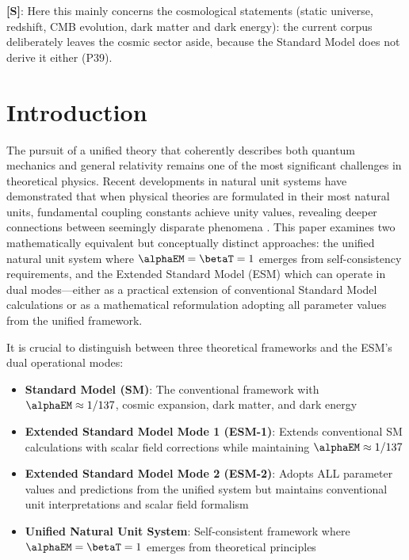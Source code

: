 	\noindent \textbf{[S]}: Here this mainly concerns the cosmological statements (static universe, redshift, CMB evolution, dark matter and dark energy): the current corpus deliberately leaves the cosmic sector aside, because the Standard Model does not derive it either (P39).
	
	\section{Introduction}
	\label{sec:introduction}
	
	The pursuit of a unified theory that coherently describes both quantum mechanics and general relativity remains one of the most significant challenges in theoretical physics. Recent developments in natural unit systems have demonstrated that when physical theories are formulated in their most natural units, fundamental coupling constants achieve unity values, revealing deeper connections between seemingly disparate phenomena \cite{pascher_unified_2025}. This paper examines two mathematically equivalent but conceptually distinct approaches: the unified natural unit system where $\alphaEM = \betaT = 1$ emerges from self-consistency requirements, and the Extended Standard Model (ESM) which can operate in dual modes—either as a practical extension of conventional Standard Model calculations or as a mathematical reformulation adopting all parameter values from the unified framework.
	
	It is crucial to distinguish between three theoretical frameworks and the ESM's dual operational modes:
	
	\begin{itemize}
		\item \textbf{Standard Model (SM)}: The conventional framework with $\alphaEM \approx 1/137$, cosmic expansion, dark matter, and dark energy \cite{Weinberg1989,PDG2020}
		\item \textbf{Extended Standard Model Mode 1 (ESM-1)}: Extends conventional SM calculations with scalar field corrections while maintaining $\alphaEM \approx 1/137$
		\item \textbf{Extended Standard Model Mode 2 (ESM-2)}: Adopts ALL parameter values and predictions from the unified system but maintains conventional unit interpretations and scalar field formalism
		\item \textbf{Unified Natural Unit System}: Self-consistent framework where $\alphaEM = \betaT = 1$ emerges from theoretical principles \cite{pascher_unified_2025}
	\end{itemize}
	
